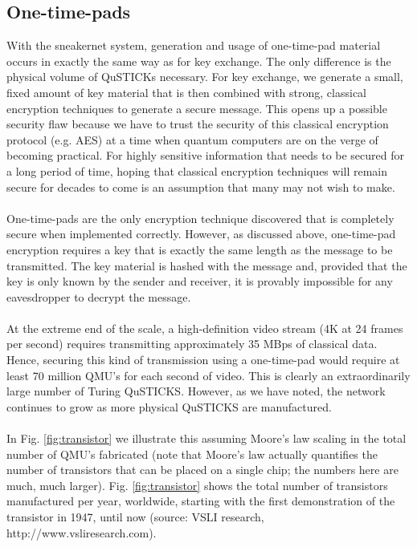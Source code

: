 \documentclass[aps,prl,twocolumn,10pt,nofootinbib]{revtex4}
\begin{document}
\subsection{One-time-pads}
With the sneakernet system, generation and usage of one-time-pad material occurs in exactly the same way as for key exchange.  The only difference is the physical volume of QuSTICKs necessary.  For key exchange, we generate a small, fixed amount of key material that is then combined with strong, classical encryption techniques to generate a secure message.  This opens up a possible security flaw because we have to trust the security of this classical encryption protocol (e.g. AES) at a time when quantum computers are on the verge of becoming practical.  For highly sensitive information that needs to be secured for a long period of time, hoping that classical encryption techniques will remain secure for decades to come is an assumption that many may not wish to make.  
\\
\\
One-time-pads are the only encryption technique discovered that is completely secure when implemented correctly.  However, as discussed above, one-time-pad encryption requires a key that is exactly the same length as the message to be transmitted.  The key material is hashed with the message and, provided that the key is only known by the sender and receiver, it is provably impossible for any eavesdropper to decrypt the message.  
\\
\\
At the extreme end of the scale, a high-definition video stream (4K at 24 frames per second) requires transmitting approximately 35 MBps of classical data.  Hence, securing this kind of transmission using a one-time-pad would require at least 70 million QMU's for each second of video.  This is clearly an extraordinarily large number of Turing QuSTICKS.  However, as we have noted, the network continues to grow as more physical QuSTICKS are manufactured.  
\\
\\
In Fig. \ref{fig:transistor} we illustrate this assuming Moore's law scaling in the total number of QMU's fabricated (note that Moore's law actually quantifies the number of transistors that can be placed on a single chip; the numbers here are much, much larger).  Fig. \ref{fig:transistor} shows the total number of transistors manufactured per year, worldwide, starting with the first demonstration of the transistor in 1947, until now (source: VSLI research, http://www.vsliresearch.com).  
\end{document}
